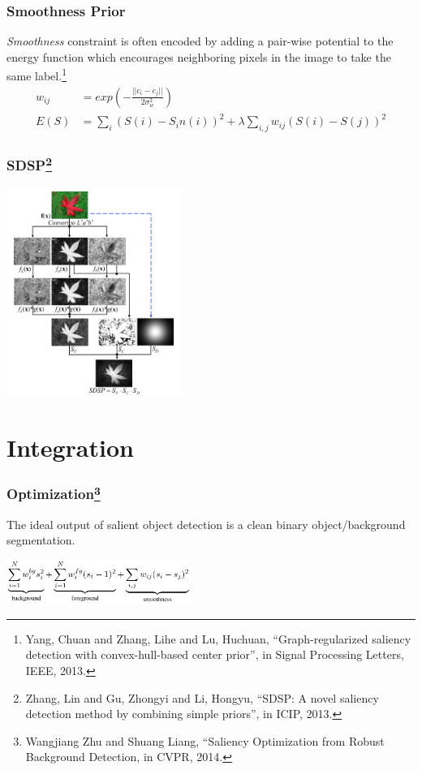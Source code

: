 \documentclass[notheorems,serif,table,compress]{beamer}  %
\begin{document}
\begin{frame}
\frametitle{Smoothness Prior}
{\color{blue}\emph{Smoothness}} constraint is often encoded by adding a pair-wise potential to the energy function which encourages neighboring pixels in the image to take the same label.\footnote{Yang, Chuan and Zhang, Lihe and Lu, Huchuan, ``Graph-regularized saliency detection with convex-hull-based center prior'', in Signal Processing Letters, IEEE, 2013.}
\begin{align}
w_{ij} & = exp\left(-\frac{||c_i-c_j||}{2\sigma_w^2}\right)\\
E(S) & = \sum_{i}(S(i)-S_in(i))^2+\lambda \sum_{i, j}w_{ij}(S(i)-S(j))^2
\end{align}
\end{frame}


\begin{frame}
\frametitle{SDSP\footnote{Zhang, Lin and Gu, Zhongyi and Li, Hongyu, ``SDSP: A novel saliency detection method by combining simple priors'', in ICIP, 2013.}}

\centering\includegraphics[width=5.7cm]{SDSP}
\end{frame}


\section{Integration}

\begin{frame}
\frametitle{Optimization\footnote{Wangjiang Zhu and Shuang Liang, ``Saliency Optimization from Robust Background Detection, in CVPR, 2014.}}
The ideal output of salient object detection is a clean binary object/background segmentation.

\centering\includegraphics[width=6cm]{optimization}
\end{frame}
\end{document}
